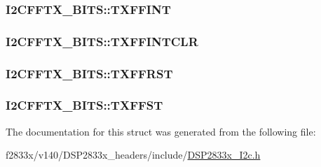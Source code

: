 \subsubsection[{T\+X\+F\+F\+I\+N\+T}]{ I2\+C\+F\+F\+T\+X\+\_\+\+B\+I\+T\+S\+::\+T\+X\+F\+F\+I\+N\+T}\label{struct_i2_c_f_f_t_x___b_i_t_s_a3b0620fc5d20d63019d6ec87e090c3df}
\hypertarget{struct_i2_c_f_f_t_x___b_i_t_s_ad3323bce272911606d49ac45a94c8180}{}
\subsubsection[{T\+X\+F\+F\+I\+N\+T\+C\+L\+R}]{ I2\+C\+F\+F\+T\+X\+\_\+\+B\+I\+T\+S\+::\+T\+X\+F\+F\+I\+N\+T\+C\+L\+R}\label{struct_i2_c_f_f_t_x___b_i_t_s_ad3323bce272911606d49ac45a94c8180}
\hypertarget{struct_i2_c_f_f_t_x___b_i_t_s_a13f0b963e09d17eb9187e11a850e50ca}{}
\subsubsection[{T\+X\+F\+F\+R\+S\+T}]{ I2\+C\+F\+F\+T\+X\+\_\+\+B\+I\+T\+S\+::\+T\+X\+F\+F\+R\+S\+T}\label{struct_i2_c_f_f_t_x___b_i_t_s_a13f0b963e09d17eb9187e11a850e50ca}
\hypertarget{struct_i2_c_f_f_t_x___b_i_t_s_a9164d0f846b070f67b2db6d3da7a7c08}{}
\subsubsection[{T\+X\+F\+F\+S\+T}]{ I2\+C\+F\+F\+T\+X\+\_\+\+B\+I\+T\+S\+::\+T\+X\+F\+F\+S\+T}\label{struct_i2_c_f_f_t_x___b_i_t_s_a9164d0f846b070f67b2db6d3da7a7c08}


The documentation for this struct was generated from the following file\+:\begin{DoxyCompactItemize}
\item 
f2833x/v140/\+D\+S\+P2833x\+\_\+headers/include/\hyperlink{_d_s_p2833x___i2c_8h}{D\+S\+P2833x\+\_\+\+I2c.\+h}\end{DoxyCompactItemize}
